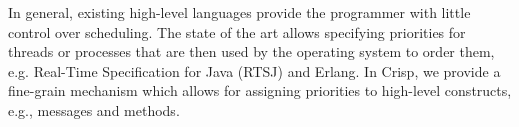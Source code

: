 % 
% 

In general, existing high-level languages provide the programmer with little control over
scheduling. The state of the art allows specifying priorities for threads or
processes that are then used by the operating system to order them, e.g.
Real-Time Specification for Java (RTSJ) and Erlang. 
In Crisp, we provide a fine-grain
mechanism which allows for assigning priorities to high-level constructs, e.g., messages and methods.




